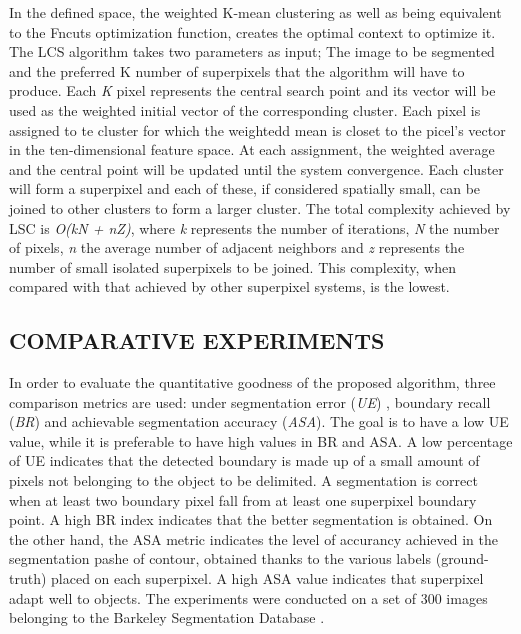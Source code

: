 In the defined space, the weighted K-mean clustering as well as being 
equivalent to the Fncuts optimization function, creates the optimal context to 
optimize it. The LCS algorithm takes two parameters as input; The image 
to be segmented and the preferred K number of superpixels that the 
algorithm will have to produce. Each \emph{K} pixel represents the central search point 
and its vector will be used as the weighted initial vector of the corresponding 
cluster. Each pixel is assigned to te cluster for which the weightedd mean 
is closet to the picel's vector in the ten-dimensional feature space. At each 
assignment, the weighted average and the central point will be updated until 
the system convergence. Each cluster will form a superpixel and each of 
these, if considered spatially small, can be joined to other clusters to form 
a larger cluster. The total complexity achieved by LSC is \emph{O(kN + nZ)}, where 
\emph{k} represents the number of iterations, \emph{N} the number of pixels, \emph{n} the average 
number of adjacent neighbors and \emph{z} represents the number of small 
isolated superpixels to be joined. This complexity, when compared with that 
achieved by other superpixel systems, is the lowest.

\subsection{COMPARATIVE EXPERIMENTS}
In order to evaluate the quantitative goodness of the proposed algorithm, 
three comparison metrics are used: under segmentation error (\emph{UE}) \cite{0781426514}, boundary 
recall (\emph{BR}) and achievable segmentation accuracy (\emph{ASA}). The 
goal is to have a low UE value, while it is preferable to have high values in BR 
and ASA. A low percentage of UE indicates that the detected boundary is made 
up of a small amount of pixels not belonging to the object to be delimited. 
A segmentation is correct when at least two boundary pixel fall from at least 
one superpixel boundary point. A high BR index indicates that the better 
segmentation is obtained. On the other hand, the ASA metric indicates the 
level of accurancy achieved in the segmentation pashe of contour, obtained 
thanks to the various labels (ground-truth) placed on each superpixel. A 
high ASA value indicates that superpixel adapt well to objects. The experiments 
were conducted on a set of 300 images belonging to the Barkeley 
Segmentation Database \cite{0781426515}.


